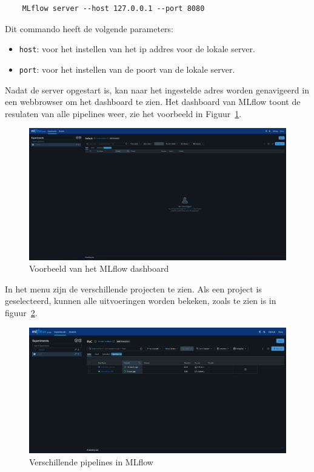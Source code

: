 \begin{verbatim}
    MLflow server --host 127.0.0.1 --port 8080
\end{verbatim}

Dit commando heeft de volgende parameters:

\begin{itemize}
    \item \texttt{host}: voor het instellen van het ip addres voor de lokale server.
    \item \texttt{port}: voor het instellen van de poort van de lokale server.
\end{itemize}

Nadat de server opgestart is, kan naar het ingestelde adres worden genavigeerd in een webbrowser om het dashboard te zien. Het dashboard van MLflow toont de resulaten van alle pipelines weer, zie het voorbeeld in Figuur~\ref{fig:MLflow_dashboard}.

\begin{figure}[h]
    \centering
    \includegraphics[width=0.9\linewidth]{graphics/MLflow_dashboard.PNG}
    \caption{Voorbeeld van het MLflow dashboard}
    \label{fig:MLflow_dashboard}
\end{figure}

In het menu zijn de verschillende projecten te zien. Als een project is geselecteerd, kunnen alle uitvoeringen worden bekeken, zoals te zien is in figuur~\ref{fig:MLflow_runs}.
\begin{figure}[h]
    \centering
    \includegraphics[width=0.9\linewidth]{graphics/MLflow_Runs.PNG}
    \caption{Verschillende pipelines in MLflow}
    \label{fig:MLflow_runs}
\end{figure}

